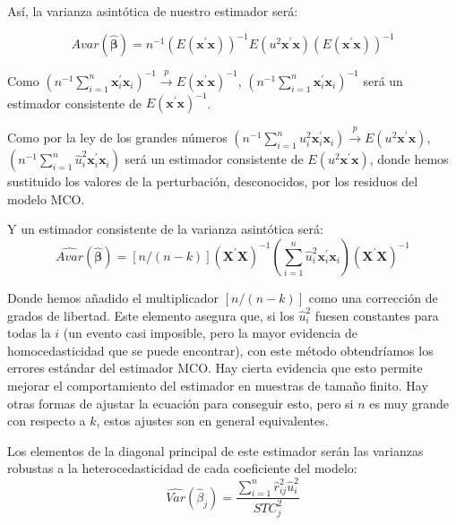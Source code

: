 As\'i, la varianza asint\'otica de nuestro estimador ser\'a:

\[Avar(\hat{\boldsymbol{\beta}})=n^{-1}\left(E(\boldsymbol{x}^{\prime}\boldsymbol{x})\right)^{-1}E(u^2\boldsymbol{x}^{\prime}\boldsymbol{x})\left(E(\boldsymbol{x}^{\prime}\boldsymbol{x})\right)^{-1}\]

Como $\left(n^{-1}\sum_{i=1}^n\boldsymbol{x}_i^{\prime}\boldsymbol{x}_i\right)^{-1}\overset{p}{\to}E(\boldsymbol{x}^{\prime}\boldsymbol{x})^{-1}$, $\left(n^{-1}\sum_{i=1}^n\boldsymbol{x}_i^{\prime}\boldsymbol{x}_i\right)^{-1}$ ser\'a un estimador consistente de $E(\boldsymbol{x}^{\prime}\boldsymbol{x})^{-1}$.

Como por la ley de los grandes n\'umeros $\left(n^{-1}\sum_{i=1}^nu_i^2\boldsymbol{x}_i^{\prime}\boldsymbol{x}_i\right)\overset{p}{\to}E(u^2\boldsymbol{x}^{\prime}\boldsymbol{x})$, $\left(n^{-1}\sum_{i=1}^n\hat{u}_i^2\boldsymbol{x}_i^{\prime}\boldsymbol{x}_i\right)$ ser\'a un estimador consistente de $E(u^2\boldsymbol{x}^{\prime}\boldsymbol{x})$, donde hemos sustituido los valores de la perturbaci\'on, desconocidos, por los residuos del modelo MCO.


Y un estimador consistente de la varianza asint\'otica ser\'a:
\begin{equation*}
\hat{Avar}(\hat{\boldsymbol{\beta}})=[n/(n-k)]\left(\boldsymbol{X}^{\prime}\boldsymbol{X}\right)^{-1}\left(\sum_{i=1}^n\hat{u}_i^2\boldsymbol{x}_i^{\prime}\boldsymbol{x}_i\right)\left(\boldsymbol{X}^{\prime}\boldsymbol{X}\right)^{-1} 
\end{equation*}


Donde hemos a\~nadido el multiplicador $[n/(n-k)]$ como una correcci\'on de grados de libertad. Este elemento asegura que, si los $\hat{u}_i^2$ fuesen constantes para todas la $i$ (un evento casi imposible, pero la mayor evidencia de homocedasticidad que se puede encontrar), con este m\'etodo obtendr\'iamos los errores est\'andar del estimador MCO. Hay cierta evidencia que esto permite mejorar el comportamiento del estimador en muestras de tama\~no finito. Hay otras formas de ajustar la ecuaci\'on para conseguir esto, pero si $n$ es muy grande con respecto a $k$, estos ajustes son en general equivalentes.

Los elementos de la diagonal principal de este estimador ser\'an las varianzas robustas a la heterocedasticidad de cada coeficiente del modelo:
\begin{equation*}
\hat{Var}(\hat{\beta}_j)=\dfrac{\sum_{i=1}^n\hat{r}_{ij}^2\hat{u}_i^2}{STC_j^2}
\end{equation*}

